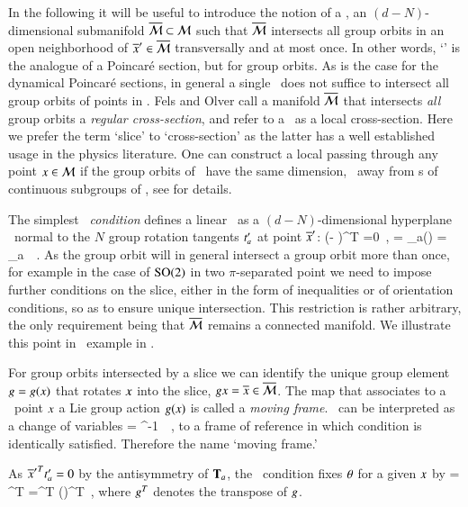 In the following it will be useful to introduce the notion of
a \emph{\slice}, an $(d-N)$-dimensional submanifold
$\overline{\cal M}\subset{\cal M}$ such that $\overline{\cal M}$ intersects all group
orbits in an open neighborhood of ${\overline{x}'} \in \overline{\cal M}$
transversally and at most once. In other words, `\slice' is
the analogue of a Poincar\'e section, but for group orbits.
As is the case for the dynamical Poincar\'e sections, in
general a single \slice\ does not suffice to intersect all
group orbits of points in \pS. Fels and Olver
call a manifold $\overline{\cal M}$ that intersects \emph{all} group
orbits a \emph{regular cross-section}, and refer to a \slice\
as a local cross-section. Here we prefer the term `slice' to
`cross-section' as the latter has a well established usage in
the physics literature. One can construct a local {\slice}
passing through any point $x\in {\cal M}$ if the group orbits of
\Group\ have the same dimension, \ie\ away from {\fixedsp s}
of continuous subgroups of \Group, see 
for details.

The simplest {\em \slice\ condition} defines a linear \slice\ as a
$(d\!-\!N)$-dim\-ens\-ion\-al hyperplane \pSRed\ normal to
the $N$ group rotation tangents $t'_{a}$ at point ${\overline{x}'}$:
\beq
(\sspRed - \slicep )^T  =0
    \,,\qquad
{} = \groupTan_a(\slicep) = \Lg_a \, \slicep
\,.
As the group orbit will in general intersect a group orbit
more than once, for example in the case of $\textrm{SO}(2)$ in two
$\pi$-separated point we need to impose further conditions on
the slice, either in the form of inequalities or of
orientation conditions, so as to ensure unique intersection.
This restriction is rather arbitrary, the only requirement
being that $\overline{\cal M}$ remains a connected manifold. We
illustrate this point in \cLf\ example in
.

For group orbits intersected by a slice we can identify the
unique group element $g=g(x)$ that rotates
$x$ into the slice, $gx = \overline{x} \in \overline{\cal M}$. The
map that associates to a \statesp\ point $x$ a Lie group
action $g(x)$ is called a \emph{moving frame}.
\Mframes\ can be interpreted as a change of variables
\beq
\sspRed = \LieEl^{-1} \, \ssp
\,,
to a frame of reference in which condition 
is identically satisfied. Therefore the name `moving frame.'



As ${\overline{x}'}^T t'_{a} =0$ by the antisymmetry of
$\mathbf{T}_a$, the \slice\ condition  fixes
${\bf \theta}$ for a given $x$ by
 = \sspRed^T  
	=\ssp^T  \LieEl(\gSpace)^T \sliceTan{a}
\,,
where $g^T$ denotes the transpose of $g$.



